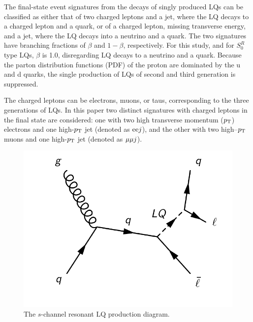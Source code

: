 The final-state event signatures from the decays of singly produced LQs can be classified as either that of two charged leptons and a jet, where the LQ decays to a charged lepton and a quark, or of a charged lepton, missing transverse energy, and a jet, where the LQ decays into a neutrino and a quark.  The two signatures have branching fractions of $\beta$ and $1-\beta$, respectively.  For this study, and for $S^{R}_{0}$ type LQs, $\beta$ is 1.0, disregarding LQ decays to a neutrino and a quark.  Because the parton distribution functions (PDF) of the proton are dominated by the u and d quarks, the single production of LQs of second and third generation is suppressed.

The charged leptons can be electrons, muons, or taus, corresponding to the three generations of LQs.  In this paper two distinct signatures with charged leptons in the final state are considered: one with two high transverse momentum ($p_{\mathrm{T}}$) electrons and one high-$p_{\mathrm{T}}$ jet (denoted as $\mathrm{e} \mathrm{e} j$), and the other with two high--$p_{\mathrm{T}}$ muons and one high-$p_{\mathrm{T}}$ jet (denoted as ${\mu} {\mu} j$).

\begin{figure}[!h]
       \centering
       \includegraphics[scale=.45]{Figures/Figures_schannel.pdf} 
       \caption{The $s$-channel resonant LQ production diagram.
	  \label{figapp:ResDiagram}}
\end{figure}

